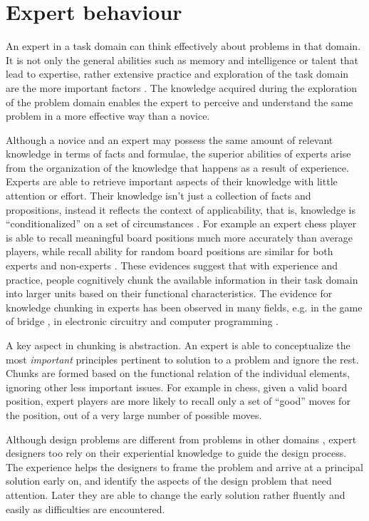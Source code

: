 

\section{Expert behaviour}
\label{xbehaviour}

An expert in a task domain can think effectively about problems in that
domain. It is not only the general abilities such as memory and
intelligence or talent that lead to expertise, rather extensive practice
and exploration of the task domain are the more important factors
\citep{ericsson02}. The knowledge acquired during the exploration of the
problem domain enables the expert to perceive and understand the same
problem in a more effective way than a novice.

Although a novice and an expert may possess the same amount of relevant
knowledge in terms of facts and formulae, the superior abilities of experts
arise from the organization of the knowledge that happens as a result of
experience. Experts are able to retrieve important aspects of their
knowledge with little attention or effort. Their knowledge isn't just a
collection of facts and propositions, instead it reflects the context of
applicability, that is, knowledge is ``conditionalized'' on a set of
circumstances \citep{glaser99, bransford00}. For example an expert chess
player is able to recall meaningful board positions much more accurately
than average players, while recall ability for random board positions are
similar for both experts and non-experts \citep{degroot65, chase73}. These
evidences suggest that with experience and practice, people cognitively
chunk the available information in their task domain into larger units
based on their functional characteristics. The evidence for knowledge
chunking in experts has been observed in many fields, e.g. in the game of
bridge \citep{engle78}, in electronic circuitry \citep{egan79} and computer
programming \citep{ehrlich1984}.

A key aspect in chunking is abstraction. An expert is able to conceptualize
the most {\em important} principles pertinent to solution to a problem and
ignore the rest.  Chunks are formed based on the functional relation of the
individual elements, ignoring other less important issues. For example in
chess, given a valid board position, expert players are more likely to
recall only a set of ``good'' moves for the position, out of a very large
number of possible moves.


Although design problems are different from problems in other domains
\citep{schon88, goel92}, expert designers too rely on their experiential
knowledge to guide the design process. The experience helps the designers
to frame the problem and arrive at a principal solution early on, and
identify the aspects of the design problem that need attention. Later
they are able to change the early solution rather fluently and easily as
difficulties are encountered.

